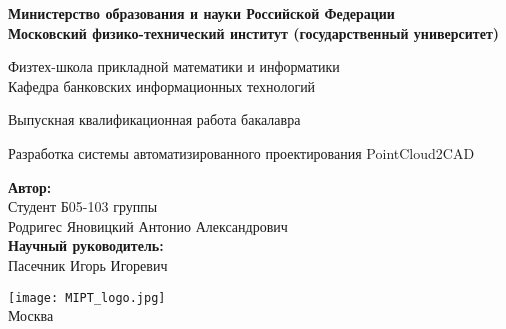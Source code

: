 \begin{center}
    \large\textbf{Министерство образования и науки Российской Федерации \\
        Московский физико-технический институт (государственный
        университет)} \\
    \vspace{1cm}

    Физтех-школа прикладной математики и информатики \\

    Кафедра банковских информационных технологий \\

    \vspace{3em}

    Выпускная квалификационная работа бакалавра
\end{center}

\begin{center}
    \vspace{\fill}
    \LARGE{Разработка системы автоматизированного проектирования PointCloud2CAD}

    \vspace{\fill}
\end{center}

\begin{flushright}
    \textbf{Автор:} \\
    Студент Б05-103 группы \\
    Родригес Яновицкий Антонио Александрович \\
    \vspace{2em}
    \textbf{Научный руководитель:} \\
    Пасечник Игорь Игоревич \\
\end{flushright}

\vspace{7em}

\begin{center}
    \texttt{[image: MIPT\_logo.jpg]}\\
    Москва \the\year{}
\end{center}

\thispagestyle{empty}

\newpage
\setcounter{page}{2}
\fancyfoot[c]{\thepage}
\fancyhead[R]{}